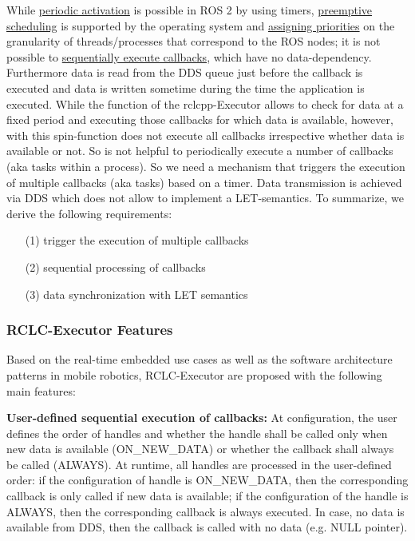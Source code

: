 While \underline{periodic activation} is possible in ROS 2 by using timers, \underline{preemptive scheduling} is supported by the operating system and \underline{assigning priorities} on the granularity of threads/processes that correspond to the ROS nodes; it is not possible to \underline{sequentially execute callbacks}, which have no data-dependency. Furthermore data is read from the DDS queue just before the callback is executed and data is written sometime during the time the application is executed. While the  function of the rclcpp-Executor allows to check for data at a fixed period and executing those callbacks for which data is available, however, with this spin-function does not execute all callbacks irrespective whether data is available or not. So  is not helpful to periodically execute a number of callbacks (aka tasks within a process). So we need a mechanism that triggers the execution of multiple callbacks (aka tasks) based on a timer. Data transmission is achieved via DDS which does not allow to implement a LET-semantics. To summarize, we derive the following requirements:
\begin{itemize}
    \item [(1)] trigger the execution of multiple callbacks
    \item [(2)] sequential processing of callbacks
    \item [(3)] data synchronization with LET semantics
\end{itemize}

\subsubsection{RCLC-Executor Features}
Based on the real-time embedded use cases as well as the software architecture patterns in mobile robotics, RCLC-Executor are proposed with the following main features:

\textbf{User-defined sequential execution of callbacks:} At configuration, the user defines the order of handles and whether the handle shall be called only when new data is available (ON\_NEW\_DATA) or whether the callback shall always be called (ALWAYS). At runtime, all handles are processed in the user-defined order: if the configuration of handle is ON\_NEW\_DATA, then the corresponding callback is only called if new data is available; if the configuration of the handle is ALWAYS, then the corresponding callback is always executed. In case, no data is available from DDS, then the callback is called with no data (e.g. NULL pointer).

